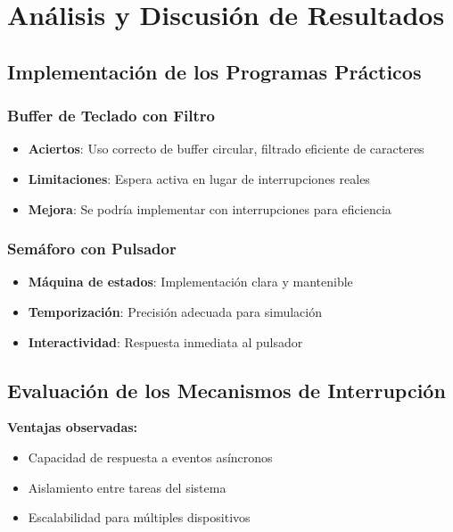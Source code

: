 \documentclass[12pt,a4paper]{article}
\begin{document}
\section{Análisis y Discusión de Resultados}

\subsection{Implementación de los Programas Prácticos}

\subsubsection{Buffer de Teclado con Filtro}
\begin{itemize}
    \item \textbf{Aciertos}: Uso correcto de buffer circular, filtrado eficiente de caracteres
    \item \textbf{Limitaciones}: Espera activa en lugar de interrupciones reales
    \item \textbf{Mejora}: Se podría implementar con interrupciones para eficiencia
\end{itemize}

\subsubsection{Semáforo con Pulsador}
\begin{itemize}
    \item \textbf{Máquina de estados}: Implementación clara y mantenible
    \item \textbf{Temporización}: Precisión adecuada para simulación
    \item \textbf{Interactividad}: Respuesta inmediata al pulsador
\end{itemize}

\subsection{Evaluación de los Mecanismos de Interrupción}

\textbf{Ventajas observadas:}
\begin{itemize}
    \item Capacidad de respuesta a eventos asíncronos
    \item Aislamiento entre tareas del sistema
    \item Escalabilidad para múltiples dispositivos
\end{itemize}
\end{document}
